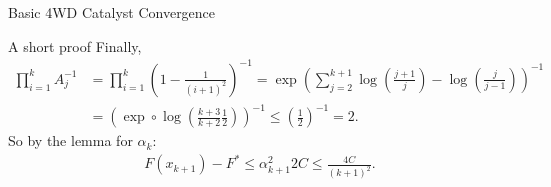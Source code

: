 \documentclass[11pt]{beamer}
\begin{document}
\begin{frame}{Basic 4WD Catalyst Convergence}
\begin{block}{\tiny A short proof}
                {\small
                    Finally, 
                    \begin{align*}
                        \prod_{i = 1}^{k} A_{j}^{-1}
                        &= 
                        \prod_{i = 1}^{k} \left(
                            1 - \frac{1}{(i + 1)^2}
                        \right)^{-1}
                        = \exp\left(
                            \sum_{j = 2}^{k + 1}
                            \log\left(
                                \frac{j + 1}{j}
                            \right) - \log\left(
                                \frac{j}{j - 1}
                            \right)
                        \right)^{-1}
                        \\
                        &= \left(\exp\circ \log
                            \left(\frac{k + 3}{k + 2}\frac{1}{2}\right)\right)^{-1} 
                        \le \left(
                            \frac{1}{2}
                        \right)^{-1}= 2. 
                    \end{align*}
                    So by the lemma for $\alpha_k$: 
                    \begin{align*}
                        F(x_{k + 1}) - F^* \le \alpha_{k + 1}^2 2C\le \frac{4C}{(k + 1)^2}. 
                    \end{align*}
                }    
            \end{block}
        \end{frame}
\end{document}
